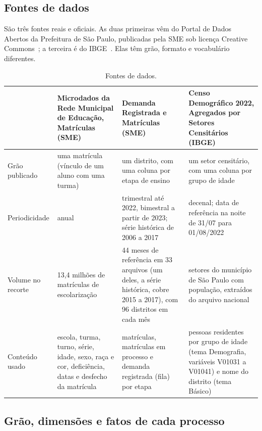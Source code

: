 \documentclass[11pt,a4paper]{article}
\begin{document}
\subsection{Fontes de dados}

São três fontes reais e oficiais. As duas primeiras vêm do Portal de Dados Abertos da Prefeitura de São Paulo, publicadas pela SME sob licença Creative Commons~\cite{sme-microdados,sme-fila}; a terceira é do IBGE~\cite{ibge-agregados}. Elas têm grão, formato e vocabulário diferentes.

\begin{table}[H]
\centering\small
\begin{tabularx}{\linewidth}{>{\raggedright}p{2.5cm}>{\raggedright}X>{\raggedright}X>{\raggedright\arraybackslash}X}
\toprule
& \textbf{Microdados da Rede Municipal de Educação, Matrículas (SME)} & \textbf{Demanda Registrada e Matrículas (SME)} & \textbf{Censo Demográfico 2022, Agregados por Setores Censitários (IBGE)} \\
\midrule
Grão publicado & uma matrícula (vínculo de um aluno com uma turma) & um distrito, com uma coluna por etapa de ensino & um setor censitário, com uma coluna por grupo de idade \\
Periodicidade & anual & trimestral até 2022, bimestral a partir de 2023; série histórica de 2006 a 2017 & decenal; data de referência na noite de 31/07 para 01/08/2022 \\
Volume no recorte & 13,4 milhões de matrículas de escolarização & 44 meses de referência em 33 arquivos (um deles, a série histórica, cobre 2015 a 2017), com 96 distritos em cada mês & 26.889 setores do município de São Paulo com população, extraídos do arquivo nacional \\
Conteúdo usado & escola, turma, turno, série, idade, sexo, raça e cor, deficiência, datas e desfecho da matrícula & matrículas, matrículas em processo e demanda registrada (fila) por etapa & pessoas residentes por grupo de idade (tema Demografia, variáveis V01031 a V01041) e nome do distrito (tema Básico) \\
\bottomrule
\end{tabularx}
\caption{Fontes de dados.}
\end{table}

\subsection{Grão, dimensões e fatos de cada processo}
\end{document}
